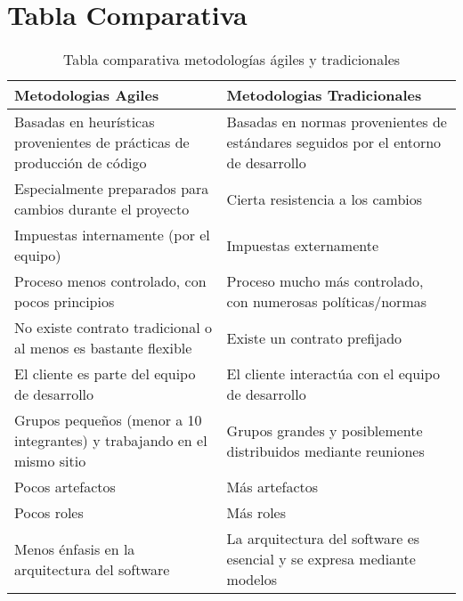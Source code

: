 

\section{Tabla Comparativa}
\begin{table}[h!]
\centering
\begin{tabular} {|p{6cm}|p{6cm}|} \hline
Metodologias Agiles & Metodologias Tradicionales \\\hline
Basadas en heur\'isticas provenientes de pr\'acticas de
producci\'on de c\'odigo & Basadas en normas provenientes de est\'andares
seguidos por el entorno de desarrollo\par \\\hline
Especialmente preparados para cambios durante el 
proyecto & Cierta resistencia a los cambios\\\hline
Impuestas internamente (por el equipo) & Impuestas externamente\\\hline
Proceso menos controlado, con pocos principios & Proceso mucho m\'as controlado, con numerosas
pol\'iticas/normas\\\hline
No existe contrato tradicional o al menos es bastante flexible & Existe un contrato prefijado\\\hline
El cliente es parte del equipo de desarrollo & El cliente interact\'ua con el equipo de desarrollo\\\hline
Grupos peque\~nos (menor a 10 integrantes) y trabajando en el mismo sitio & Grupos grandes y posiblemente distribuidos mediante reuniones\\\hline
Pocos artefactos & M\'as artefactos\\\hline
Pocos roles & M\'as roles\\\hline
Menos \'enfasis en la arquitectura del software & La arquitectura del software es esencial y se expresa mediante modelos\\\hline


\end{tabular}
\caption{Tabla comparativa metodolog\'ias \'agiles y tradicionales}
\end{table}

